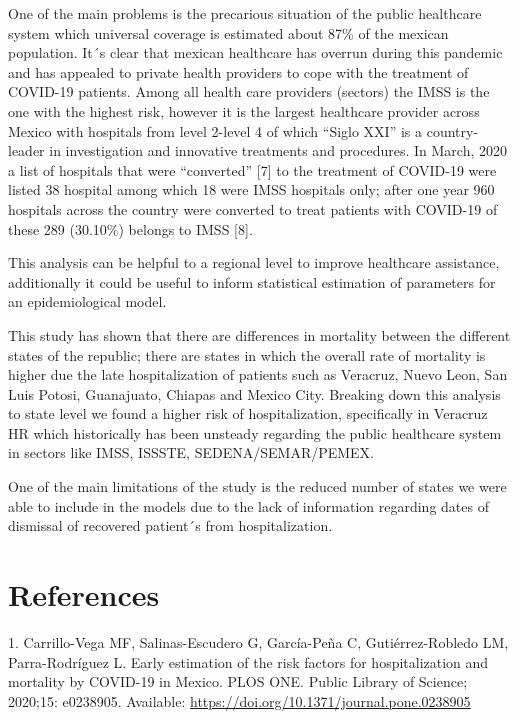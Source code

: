 \documentclass[10pt,letterpaper]{article}
\begin{document}
One of the main problems is the precarious situation of the public
healthcare system which universal coverage is estimated about 87\% of
the mexican population. It´s clear that mexican healthcare has overrun
during this pandemic and has appealed to private health providers to
cope with the treatment of COVID-19 patients. Among all health care
providers (sectors) the IMSS is the one with the highest risk, however
it is the largest healthcare provider across Mexico with hospitals from
level 2-level 4 of which ``Siglo XXI'' is a country-leader in
investigation and innovative treatments and procedures. In March, 2020 a
list of hospitals that were ``converted'' {[}7{]} to the treatment of
COVID-19 were listed 38 hospital among which 18 were IMSS hospitals
only; after one year 960 hospitals across the country were converted to
treat patients with COVID-19 of these 289 (30.10\%) belongs to IMSS
{[}8{]}.

This analysis can be helpful to a regional level to improve healthcare
assistance, additionally it could be useful to inform statistical
estimation of parameters for an epidemiological model.

This study has shown that there are differences in mortality between the
different states of the republic; there are states in which the overall
rate of mortality is higher due the late hospitalization of patients
such as Veracruz, Nuevo Leon, San Luis Potosi, Guanajuato, Chiapas and
Mexico City. Breaking down this analysis to state level we found a
higher risk of hospitalization, specifically in Veracruz HR which
historically has been unsteady regarding the public healthcare system in
sectors like IMSS, ISSSTE, SEDENA/SEMAR/PEMEX.

One of the main limitations of the study is the reduced number of states
we were able to include in the models due to the lack of information
regarding dates of dismissal of recovered patient´s from
hospitalization.

\section*{References}\label{references}

\hypertarget{refs}{}
\hypertarget{ref-Carrillo-Vega2020}{}
1. Carrillo-Vega MF, Salinas-Escudero G, García-Peña C,
Gutiérrez-Robledo LM, Parra-Rodríguez L. Early estimation of the risk
factors for hospitalization and mortality by COVID-19 in Mexico. PLOS
ONE. Public Library of Science; 2020;15: e0238905. Available:
\url{https://doi.org/10.1371/journal.pone.0238905}
\end{document}
